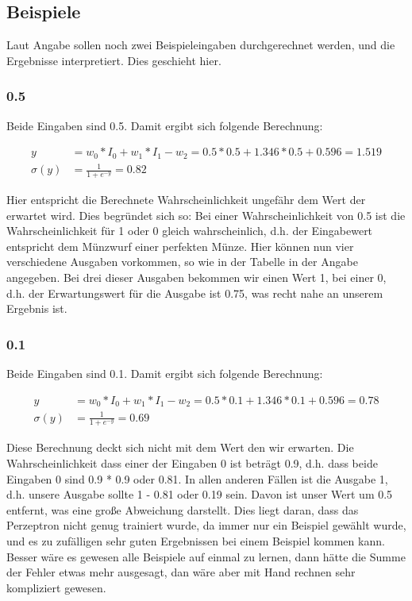 \documentclass[a4paper]{article}
\begin{document}

\subsection{Beispiele}
Laut Angabe sollen noch zwei Beispieleingaben durchgerechnet werden, und die Ergebnisse interpretiert. Dies geschieht hier.

\subsubsection{0.5}
Beide Eingaben sind 0.5. Damit ergibt sich folgende Berechnung:

\begin{align*}
	y &= w_0 * I_0 + w_1 * I_1 - w_2 = 0.5 * 0.5 + 1.346 * 0.5 + 0.596 = 1.519 \\
	\sigma(y) &= \frac{1}{1 + e^{-y}} = 0.82
\end{align*}

Hier entspricht die Berechnete Wahrscheinlichkeit ungefähr dem Wert der erwartet wird. Dies begründet sich so: Bei einer Wahrscheinlichkeit von 0.5 ist die Wahrscheinlichkeit für 1 oder 0 gleich wahrscheinlich, d.h. der Eingabewert entspricht dem Münzwurf einer perfekten Münze. Hier können nun vier verschiedene Ausgaben vorkommen, so wie in der Tabelle in der Angabe angegeben. Bei drei dieser Ausgaben bekommen wir einen Wert 1, bei einer 0, d.h. der Erwartungswert für die Ausgabe ist 0.75, was recht nahe an unserem Ergebnis ist.

\subsubsection{0.1}
Beide Eingaben sind 0.1. Damit ergibt sich folgende Berechnung:

\begin{align*}
	y &= w_0 * I_0 + w_1 * I_1 - w_2 = 0.5 * 0.1 + 1.346 * 0.1 + 0.596 = 0.78 \\
	\sigma(y) &= \frac{1}{1 + e^{-y}} = 0.69
\end{align*}

Diese Berechnung deckt sich nicht mit dem Wert den wir erwarten. Die Wahrscheinlichkeit dass einer der Eingaben 0 ist beträgt 0.9, d.h. dass beide Eingaben 0 sind 0.9 * 0.9 oder 0.81. In allen anderen Fällen ist die Ausgabe 1, d.h. unsere Ausgabe sollte 1 - 0.81 oder 0.19 sein. Davon ist unser Wert um 0.5 entfernt, was eine große Abweichung darstellt. Dies liegt daran, dass das Perzeptron nicht genug trainiert wurde, da immer nur ein Beispiel gewählt wurde, und es zu zufälligen sehr guten Ergebnissen bei einem Beispiel kommen kann. Besser wäre es gewesen alle Beispiele auf einmal zu lernen, dann hätte die Summe der Fehler etwas mehr ausgesagt, dan wäre aber mit Hand rechnen sehr kompliziert gewesen.
\end{document}
